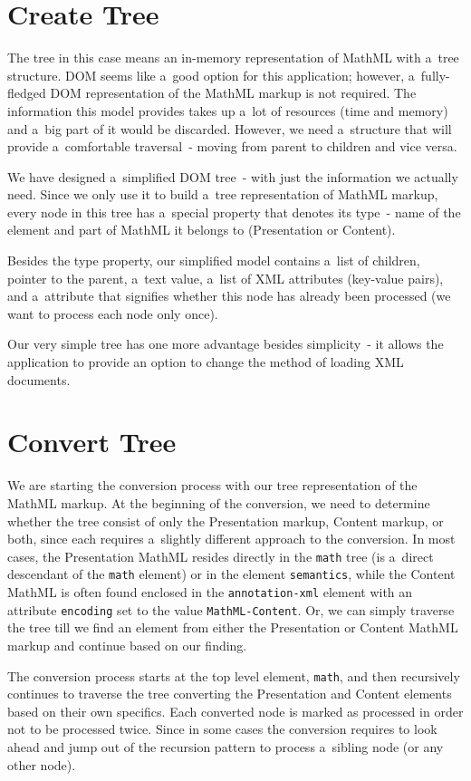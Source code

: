 \documentclass[11pt,oneside,final]{fithesis2}
\begin{document}
\section{Create Tree}
\label{section:createtree}
The tree in this case means an in-memory representation of MathML with a~tree structure. DOM seems like a~good option for this application; however, a~fully-fledged DOM representation of the MathML markup is not required. The information this model provides takes up a~lot of resources (time and memory) and a~big part of it would be discarded. However, we need a~structure that will provide a~comfortable traversal~- moving from parent to children and vice versa.

We have designed a~simplified DOM tree~- with just the information we actually need. Since we only use it to build a~tree representation of MathML markup, every node in this tree has a~special property that denotes its type~- name of the element and part of MathML it belongs to (Presentation or Content). 

Besides the type property, our simplified model contains a~list of children, pointer to the parent, a~text value, a~list of XML attributes (key-value pairs), and a~attribute that signifies whether this node has already been processed (we want to process each node only once).

Our very simple tree has one more advantage besides simplicity~- it allows the application to provide an option to change the method of loading XML documents.

\section{Convert Tree}
We are starting the conversion process with our tree representation of the MathML markup. At the beginning of the conversion, we need to determine whether the tree consist of only the Presentation markup, Content markup, or both, since each requires a~slightly different approach to the conversion. In most cases, the Presentation MathML resides directly in the \texttt{math} tree (is a~direct descendant of the \texttt{math} element) or in the element \texttt{semantics}, while the Content MathML is often found enclosed in the \texttt{annotation-xml} element with an attribute \texttt{encoding} set to the value \texttt{MathML-Content}. Or, we can simply traverse the tree till we find an element from either the Presentation or Content MathML markup and continue based on our finding.

The conversion process starts at the top level element, \texttt{math}, and then recursively continues to traverse the tree  converting the Presentation and Content elements based on their own specifics. Each converted node is marked as processed in order not to be processed twice. Since in some cases the conversion requires to look ahead and jump out of the recursion pattern to process a~sibling node (or any other node).
\end{document}
